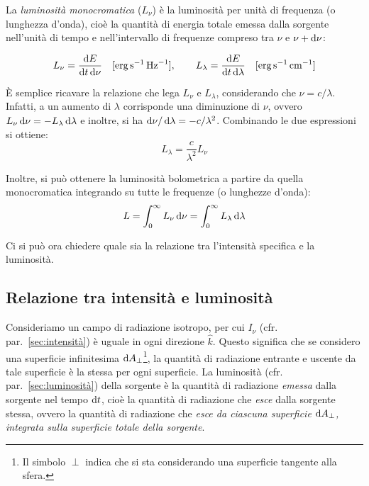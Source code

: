 La \emph{luminosità monocromatica} ($L_\nu$) è la luminosità per unità di frequenza (o lunghezza d'onda), cioè la quantità di energia totale emessa dalla sorgente nell'unità di tempo e nell'intervallo di frequenze compreso tra $\nu$ e $\nu + \ud \nu$:

\begin{equation}\label{eq:def-luminosità-monocromatica}
    L_\nu = \frac{\ud E}{\ud t \ud \nu} \quad [\si{erg.s^{-1}.Hz^{-1}}], \qquad L_\lambda = \frac{\ud E}{\ud t \ud \lambda} \quad [\si{erg.s^{-1}.cm^{-1}}]
\end{equation}

È semplice ricavare la relazione che lega $L_\nu$ e $L_\lambda$, considerando che $\nu = c / \lambda$. Infatti, a un aumento di $\lambda$ corrisponde una diminuzione di $\nu$, ovvero $L_\nu \ud \nu = - L_\lambda \ud \lambda$ e inoltre, si ha $\ud \nu / \ud \lambda = - c / \lambda^2$. Combinando le due espressioni si ottiene:
\begin{equation}\label{eq:luminosità-monocromatica}
    L_\lambda = \frac{c}{\lambda^2} L_\nu
\end{equation}

Inoltre, si può ottenere la luminosità bolometrica a partire da quella monocromatica integrando su tutte le frequenze (o lunghezze d'onda):
\begin{equation}\label{eq:luminosità-bolometrica}
    L = \int_0^\infty L_\nu \ud \nu = \int_0^\infty L_\lambda \ud \lambda
\end{equation}

Ci si può ora chiedere quale sia la relazione tra l'intensità specifica e la luminosità.

\subsection{Relazione tra intensità e luminosità}\label{sec:relazione-intensità-luminosità}
Consideriamo un campo di radiazione isotropo, per cui $I_\nu$ (cfr. par.~\ref{sec:intensità}) è uguale in ogni direzione $\hat{k}$. Questo significa che se considero una superficie infinitesima $\ud A_\perp$\footnote{Il simbolo $\perp$ indica che si sta considerando una superficie tangente alla sfera. }, la quantità di radiazione entrante e uscente da tale superficie è la stessa per ogni superficie. La luminosità (cfr. par.~\ref{sec:luminosità}) della sorgente è la quantità di radiazione \emph{emessa} dalla sorgente nel tempo $\ud t$, cioè la quantità di radiazione che \emph{esce} dalla sorgente stessa, ovvero la quantità di radiazione che \emph{esce da ciascuna superficie $\ud A_\perp$, integrata sulla superficie totale della sorgente}.

